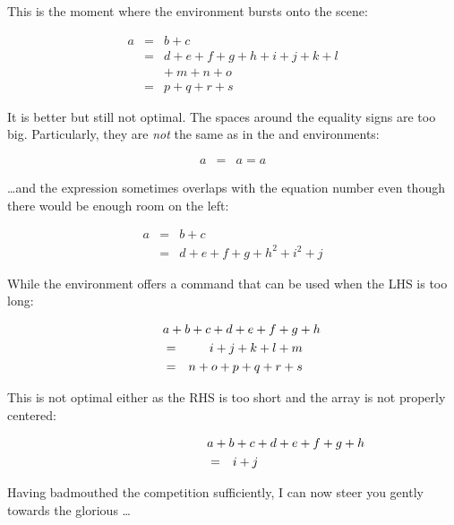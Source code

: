 This is the moment where the  environment bursts onto the scene:
\begin{example}
\begin{eqnarray}
  a & = & b + c \\
  & = & d + e + f + g + h + i 
  + j + k + l \nonumber \\
  && +\: m + n + o \\
  & = & p + q + r + s
\end{eqnarray}
\end{example}

It is better but still not optimal. The spaces around the equality signs are too big.
Particularly, they are \emph{not} the same as in the
 and  environments:
\begin{example}
\begin{eqnarray}
  a & = & a = a
\end{eqnarray}
\end{example}

\noindent \ldots and the expression sometimes overlaps with the equation number even
  though there would be enough room on the left:
\begin{example}
\begin{eqnarray}
  a & = & b + c 
  \\
  & = & d + e + f + g + h^2 
  + i^2 + j 
  \label{eq:faultyeqnarray}
\end{eqnarray}
\end{example}

\noindent While the environment offers a command  that can
  be used when the LHS is too long:
\begin{example}
\begin{eqnarray}
  \lefteqn{a + b + c + d 
    + e + f + g + h}\nonumber\\
  & = & i + j + k + l + m 
  \\
  & = & n + o + p + q + r + s
\end{eqnarray}
\end{example}
\noindent This is not optimal either as the RHS is too short and the array is
not properly centered:
\begin{example}
\begin{eqnarray}
  \lefteqn{a + b + c + d 
    + e + f + g + h} 
  \nonumber \\
  & = & i + j 
\end{eqnarray}
\end{example}

\noindent Having badmouthed the competition sufficiently, I can now steer you gently towards the glorious \ldots

